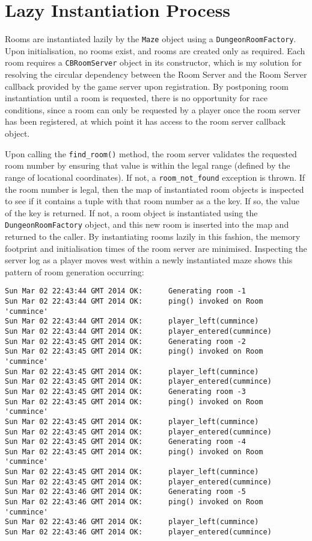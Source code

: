 \documentclass[12pt,a4paper]{article}
\begin{document}
\newpage
\section{Lazy Instantiation Process}

Rooms are instantiated lazily by the \texttt{Maze} object using a
\texttt{DungeonRoomFactory}. Upon initialisation, no rooms exist, and
rooms are created only as required. Each room requires a
\texttt{CBRoomServer} object in its constructor, which is my solution
for resolving the circular dependency between the Room Server and the
Room Server callback provided by the game server upon registration. By
postponing room instantiation until a room is requested, there is no
opportunity for race conditions, since a room can only be requested by
a player once the room server has been registered, at which point it
has access to the room server callback object.

Upon calling the \texttt{find\_room()} method, the room server
validates the requested room number by ensuring that value is within
the legal range (defined by the range of locational coordinates). If
not, a \texttt{room\_not\_found} exception is thrown. If the room
number is legal, then the map of instantiated room objects is
inspected to see if it contains a tuple with that room number as a the
key. If so, the value of the key is returned. If not, a room object is
instantiated using the \texttt{DungeonRoomFactory} object, and this
new room is inserted into the map and returned to the caller. By
instantiating rooms lazily in this fashion, the memory footprint and
initialisation times of the room server are minimised. Inspecting the
server log as a player moves west within a newly instantiated maze
shows this pattern of room generation occurring:

\begin{verbatim}
Sun Mar 02 22:43:44 GMT 2014 OK:      Generating room -1
Sun Mar 02 22:43:44 GMT 2014 OK:      ping() invoked on Room 'cummince'
Sun Mar 02 22:43:44 GMT 2014 OK:      player_left(cummince)
Sun Mar 02 22:43:44 GMT 2014 OK:      player_entered(cummince)
Sun Mar 02 22:43:45 GMT 2014 OK:      Generating room -2
Sun Mar 02 22:43:45 GMT 2014 OK:      ping() invoked on Room 'cummince'
Sun Mar 02 22:43:45 GMT 2014 OK:      player_left(cummince)
Sun Mar 02 22:43:45 GMT 2014 OK:      player_entered(cummince)
Sun Mar 02 22:43:45 GMT 2014 OK:      Generating room -3
Sun Mar 02 22:43:45 GMT 2014 OK:      ping() invoked on Room 'cummince'
Sun Mar 02 22:43:45 GMT 2014 OK:      player_left(cummince)
Sun Mar 02 22:43:45 GMT 2014 OK:      player_entered(cummince)
Sun Mar 02 22:43:45 GMT 2014 OK:      Generating room -4
Sun Mar 02 22:43:45 GMT 2014 OK:      ping() invoked on Room 'cummince'
Sun Mar 02 22:43:45 GMT 2014 OK:      player_left(cummince)
Sun Mar 02 22:43:45 GMT 2014 OK:      player_entered(cummince)
Sun Mar 02 22:43:46 GMT 2014 OK:      Generating room -5
Sun Mar 02 22:43:46 GMT 2014 OK:      ping() invoked on Room 'cummince'
Sun Mar 02 22:43:46 GMT 2014 OK:      player_left(cummince)
Sun Mar 02 22:43:46 GMT 2014 OK:      player_entered(cummince)
\end{verbatim}
\end{document}
